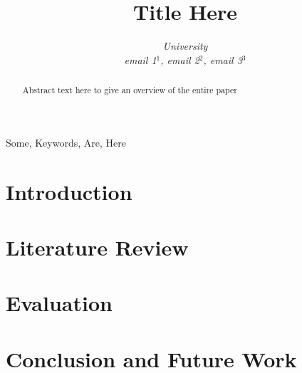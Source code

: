 \documentclass[conference]{IEEEtran}
\begin{document}
\title{Title Here}

\author{
\textit{University}\\
\textit{email 1$^{1}$, email 2$^{2}$, email 3$^{3}$}}

  \maketitle

  \begin{abstract}
    Abstract text here to give an overview of the entire paper
  \end{abstract}

  \begin{IEEEkeywords}
    Some, Keywords, Are, Here

  \end{IEEEkeywords}

  \section{Introduction}
  

  \section{Literature Review}
    

  \section{Evaluation}
  \label{Evaluation}
    

  \section{Conclusion and Future Work}
  \label{Conclusion}
    

  
  
\end{document}
